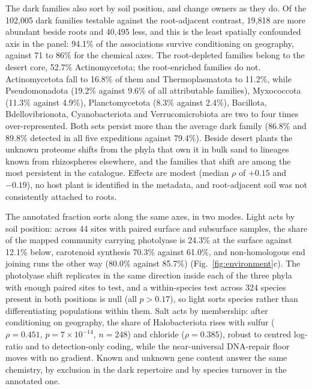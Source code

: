 \documentclass[11pt]{article}
\begin{document}
The dark families also sort by soil position, and change owners as they do. Of the 102{,}005 dark
families testable against the root-adjacent contrast, 19{,}818 are more abundant beside roots and
40{,}495 less, and this is the least spatially confounded axis in the panel: 94.1\% of the
associations survive conditioning on geography, against 71 to 86\% for the chemical axes. The
root-depleted families belong to the desert core, 52.7\% Actinomycetota; the root-enriched families
do not. Actinomycetota fall to 16.8\% of them and Thermoplasmatota to 11.2\%, while Pseudomonadota
(19.2\% against 9.6\% of all attributable families), Myxococcota (11.3\% against 4.9\%),
Planctomycetota (8.3\% against 2.4\%), Bacillota, Bdellovibrionota, Cyanobacteriota and
Verrucomicrobiota are two to four times over-represented. Both sets persist more than the average
dark family (86.8\% and 89.8\% detected in all five expeditions against 79.4\%). Beside desert plants
the unknown proteome shifts from the phyla that own it in bulk sand to lineages known from
rhizospheres elsewhere, and the families that shift are among the most persistent in the catalogue.
Effects are modest (median $\rho$ of $+0.15$ and $-0.19$), no host plant is identified in the
metadata, and root-adjacent soil was not consistently attached to roots.

The annotated fraction sorts along the same axes, in two modes. Light acts by soil position:
across 44 sites with paired surface and subsurface samples, the share of the mapped community
carrying photolyase is 24.3\% at the surface against 12.1\% below, carotenoid synthesis 70.3\%
against 61.0\%, and non-homologous end joining runs the other way (80.0\% against 85.7\%)
(Fig.~\ref{fig:environment}c). The photolyase shift replicates in the same direction inside each of
the three phyla with enough paired sites to test, and a within-species test across 324 species
present in both positions is null (all $p > 0.17$), so light sorts species rather than
differentiating populations within them. Salt acts by membership: after conditioning on geography,
the share of Halobacteriota rises with sulfur ($\rho = 0.451$, $p = 7 \times 10^{-14}$, $n = 248$)
and chloride ($\rho = 0.385$), robust to centred log-ratio and to detection-only coding, while the
near-universal DNA-repair floor moves with no gradient. Known and unknown gene content answer the same
chemistry, by exclusion in the dark repertoire and by species turnover in the annotated one.

\end{document}

